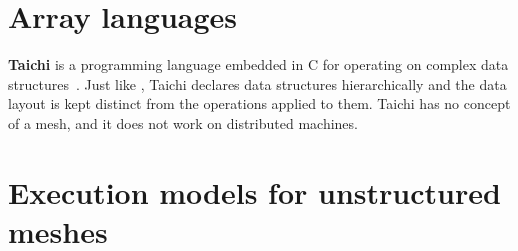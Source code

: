 \documentclass[thesis]{subfiles}
\begin{document}
\section{Array languages}


\textbf{Taichi} is a programming language embedded in C\+\+ for operating on complex data structures~\cite{huTaichiLanguageHighperformance2019}.
Just like , Taichi declares data structures hierarchically and the data layout is kept distinct from the operations applied to them.
Taichi has no concept of a mesh, and it does not work on distributed machines.



\section{Execution models for unstructured meshes}




\end{document}
